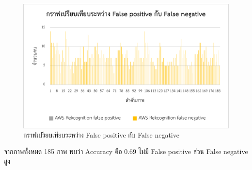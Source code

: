 \begin{figure}[ht]
    \centering
    \includegraphics[scale=1]{images/graph2_zone2.png}
    \caption[graph2-2]{กราฟเปรียบเทียบระหว่าง False positive กับ False negative}
    \label{fig:graph2-2}
\end{figure}
จากภาพทั้งหมด 185 ภาพ พบว่า Accuracy คือ 0.69 ไม่มี False positive ส่วน False negative สูง

